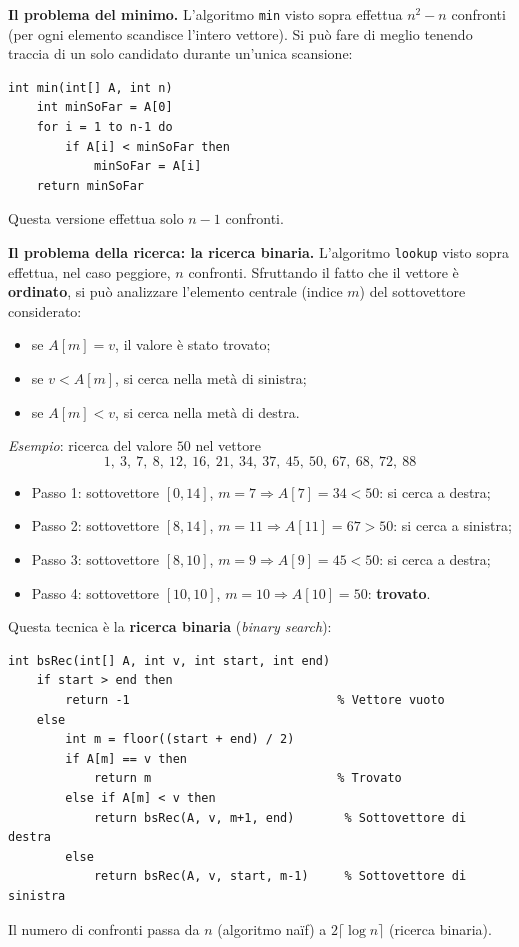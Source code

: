 \documentclass[12pt, a4paper]{article}
\begin{document}
\textbf{Il problema del minimo.} L'algoritmo \texttt{min} visto sopra effettua $n^2-n$ confronti (per ogni elemento scandisce l'intero vettore). Si può fare di meglio tenendo traccia di un solo candidato durante un'unica scansione:
\begin{verbatim}
int min(int[] A, int n)
    int minSoFar = A[0]
    for i = 1 to n-1 do
        if A[i] < minSoFar then
            minSoFar = A[i]
    return minSoFar
\end{verbatim}
Questa versione effettua solo $n-1$ confronti.

\textbf{Il problema della ricerca: la ricerca binaria.} L'algoritmo \texttt{lookup} visto sopra effettua, nel caso peggiore, $n$ confronti. Sfruttando il fatto che il vettore è \textbf{ordinato}, si può analizzare l'elemento centrale (indice $m$) del sottovettore considerato:
\begin{itemize}
    \item se $A[m] = v$, il valore è stato trovato;
    \item se $v < A[m]$, si cerca nella metà di sinistra;
    \item se $A[m] < v$, si cerca nella metà di destra.
\end{itemize}

\textit{Esempio}: ricerca del valore $50$ nel vettore
$$1,\ 3,\ 7,\ 8,\ 12,\ 16,\ 21,\ 34,\ 37,\ 45,\ 50,\ 67,\ 68,\ 72,\ 88$$
\begin{itemize}
    \item Passo 1: sottovettore $[0,14]$, $m=7 \Rightarrow A[7]=34 < 50$: si cerca a destra;
    \item Passo 2: sottovettore $[8,14]$, $m=11 \Rightarrow A[11]=67 > 50$: si cerca a sinistra;
    \item Passo 3: sottovettore $[8,10]$, $m=9 \Rightarrow A[9]=45 < 50$: si cerca a destra;
    \item Passo 4: sottovettore $[10,10]$, $m=10 \Rightarrow A[10]=50$: \textbf{trovato}.
\end{itemize}

Questa tecnica è la \textbf{ricerca binaria} (\textit{binary search}):
\begin{verbatim}
int bsRec(int[] A, int v, int start, int end)
    if start > end then
        return -1                             % Vettore vuoto
    else
        int m = floor((start + end) / 2)
        if A[m] == v then
            return m                          % Trovato
        else if A[m] < v then
            return bsRec(A, v, m+1, end)       % Sottovettore di destra
        else
            return bsRec(A, v, start, m-1)     % Sottovettore di sinistra
\end{verbatim}
Il numero di confronti passa da $n$ (algoritmo naïf) a $2\lceil \log n \rceil$ (ricerca binaria).
\end{document}
